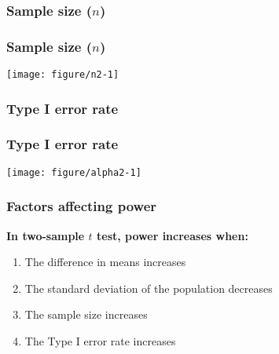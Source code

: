 \documentclass[color=usenames,dvipsnames]{beamer}\usepackage[]{graphicx}\usepackage[]{color}
\begin{document}
\begin{frame}[fragile]
  \frametitle{Sample size ($n$)}


\end{frame}







\begin{frame}[fragile]
  \frametitle{Sample size ($n$)}
  \texttt{[image: figure/n2-1]}
\end{frame}






\begin{frame}[fragile]
  \frametitle{Type I error rate}


\end{frame}





\begin{frame}[fragile]
  \frametitle{Type I error rate}
  \texttt{[image: figure/alpha2-1]}
\end{frame}








\begin{frame}
  \frametitle{Factors affecting power}
  \large
  {\bf In two-sample $t$ test, power increases when:}
  \begin{enumerate}[\bf (1)]
    \item The difference in means increases
    \item The standard deviation of the population decreases
    \item The sample size increases
    \item The Type I error rate increases
  \end{enumerate}
\end{frame}
\end{document}
